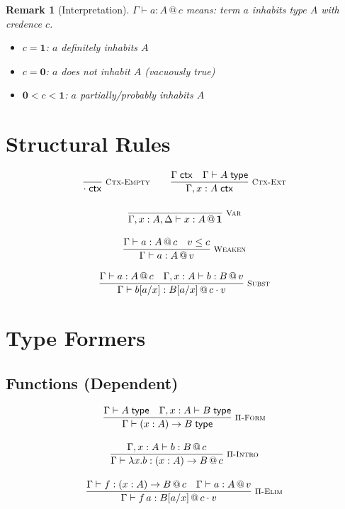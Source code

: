 \documentclass[11pt,a4paper]{article}
\makeatletter
\newcommand{\infer}[3][]{%
  \genfrac{}{}{0.4pt}{0}{#3}{#2}\;\textsc{\footnotesize #1}%
}
\newtheorem{remark}{Remark}[section]
\newcommand{\ctx}{\;\mathsf{ctx}}
\newcommand{\type}{\;\mathsf{type}}
\newcommand{\at}[1]{\,@\,#1}
\newcommand{\one}{\mathbf{1}}
\newcommand{\zero}{\mathbf{0}}
\makeatother
\begin{document}
\begin{remark}[Interpretation]
$\Gamma \vdash a : A \at{c}$ means: term $a$ inhabits type $A$ with credence $c$.
\begin{itemize}
    \item $c = \one$: $a$ definitely inhabits $A$
    \item $c = \zero$: $a$ does not inhabit $A$ (vacuously true)
    \item $\zero < c < \one$: $a$ partially/probably inhabits $A$
\end{itemize}
\end{remark}

\section{Structural Rules}

\begin{gather}
\infer[\textsc{Ctx-Empty}]
  {\cdot \ctx}
  {}
\qquad
\infer[\textsc{Ctx-Ext}]
  {\Gamma, x : A \ctx}
  {\Gamma \ctx \quad \Gamma \vdash A \type}
\\[1em]
\infer[\textsc{Var}]
  {\Gamma, x : A, \Delta \vdash x : A \at{\one}}
  {}
\\[1em]
\infer[\textsc{Weaken}]
  {\Gamma \vdash a : A \at{v}}
  {\Gamma \vdash a : A \at{c} \quad v \leq c}
\\[1em]
\infer[\textsc{Subst}]
  {\Gamma \vdash b[a/x] : B[a/x] \at{c \cdot v}}
  {\Gamma \vdash a : A \at{c} \quad \Gamma, x : A \vdash b : B \at{v}}
\end{gather}

\section{Type Formers}

\subsection{Functions (Dependent)}

\begin{gather}
\infer[\textsc{$\Pi$-Form}]
  {\Gamma \vdash (x : A) \to B \type}
  {\Gamma \vdash A \type \quad \Gamma, x : A \vdash B \type}
\\[1em]
\infer[\textsc{$\Pi$-Intro}]
  {\Gamma \vdash \lambda x. b : (x : A) \to B \at{c}}
  {\Gamma, x : A \vdash b : B \at{c}}
\\[1em]
\infer[\textsc{$\Pi$-Elim}]
  {\Gamma \vdash f\,a : B[a/x] \at{c \cdot v}}
  {\Gamma \vdash f : (x : A) \to B \at{c} \quad \Gamma \vdash a : A \at{v}}
\end{gather}
\end{document}
